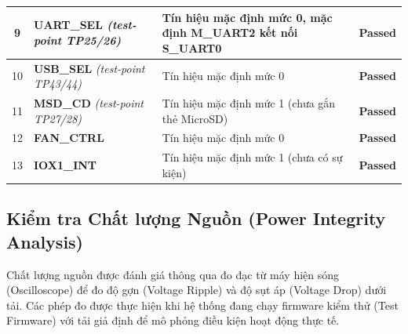 \begin{longtable}{|c|p{5.5cm}|p{6.5cm}|c|}
            9 & \textbf{UART\_SEL} \newline \textit{(test-point TP25/26)} & Tín hiệu mặc định mức 0, mặc định M\_UART2 kết nối S\_UART0 & \textcolor{modern_blue}{\textbf{Passed}} \\ \hline
            10 & \textbf{USB\_SEL} \newline \textit{(test-point TP43/44)} & Tín hiệu mặc định mức 0 & \textcolor{modern_blue}{\textbf{Passed}} \\ \hline
            11 & \textbf{MSD\_CD} \newline \textit{(test-point TP27/28)} & Tín hiệu mặc định mức 1 (chưa gắn thẻ MicroSD) & \textcolor{modern_blue}{\textbf{Passed}} \\ \hline
            12 & \textbf{FAN\_CTRL} & Tín hiệu mặc định mức 0 & \textcolor{modern_blue}{\textbf{Passed}} \\ \hline
            13 & \textbf{IOX1\_INT} & Tín hiệu mặc định mức 1 (chưa có sự kiện) & \textcolor{modern_blue}{\textbf{Passed}} \\ \hline
        
        \end{longtable}

    \subsection{Kiểm tra Chất lượng Nguồn (Power Integrity Analysis)}
        Chất lượng nguồn được đánh giá thông qua đo đạc từ máy hiện sóng (Oscilloscope) để đo độ gợn (Voltage Ripple) và độ sụt áp (Voltage Drop) dưới tải. Các phép đo được thực hiện khi hệ thống đang chạy firmware kiểm thử (Test Firmware) với tải giả định để mô phỏng điều kiện hoạt động thực tế.

